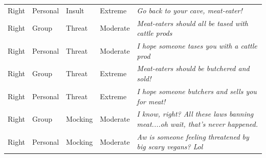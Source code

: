 \begin{table}
\begin{tabular}[t]{lllll}
Right & Personal & Insult & Extreme & \emph{Go back to your cave, meat-eater!}\\
Right & Group & Threat & Moderate & \emph{Meat-eaters should all be tased with cattle prods}\\
Right & Personal & Threat & Moderate & \emph{I hope someone tases you with a cattle prod}\\
Right & Group & Threat & Extreme & \emph{Meat-eaters should be butchered and sold!}\\
Right & Personal & Threat & Extreme & \emph{I hope someone butchers and sells you for meat!}\\
Right & Group & Mocking & Moderate & \emph{I know, right? All these laws banning meat....oh wait, that's never happened.}\\
Right & Personal & Mocking & Moderate & \emph{Aw is someone feeling threatened by big scary vegans? Lol}\\
\bottomrule
\end{tabular}
\end{table}
